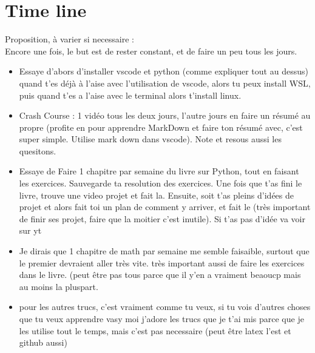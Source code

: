\documentclass[12pt]{article}
\begin{document}
\section{Time line}
Proposition, à varier si necessaire : \\
Encore une fois, le but est de rester constant, et de faire un peu tous les jours.\\
\begin{itemize}
  \item Essaye d'abors d'installer vscode et python (comme expliquer tout au dessus) quand t'es déjà à l'aise avec
  l'utilisation de vscode, alors tu peux install WSL, puis quand t'es a l'aise avec le terminal alors t'install linux.
  \item Crash Course : 1 vidéo tous les deux jours, l'autre jours en faire un résumé au propre (profite en pour 
  apprendre MarkDown et faire ton résumé avec, c'est super simple. Utilise mark down dans vscode). Note et resous aussi 
  les quesitons.
  \item Essaye de Faire 1 chapitre par semaine du livre sur Python, tout en faisant les exercices. Sauvegarde ta resolution 
  des exercices. Une fois que t'as fini le livre, trouve une video projet et fait la. Ensuite, soit t'as pleins d'idées de projet
  et alors fait toi un plan de comment y arriver, et fait le (très important de finir ses projet, faire que la moitier c'est inutile).
  Si t'as pas d'idée va voir sur yt
  \item Je dirais que 1 chapitre de math par semaine me semble faisaible, surtout que le premier devraient aller très vite.
  très important aussi de faire les exercices dans le livre. (peut être pas tous parce que il y'en a vraiment beaoucp mais au moins 
  la pluspart.
  \item pour les autres trucs, c'est vraiment comme tu veux, si tu vois d'autres choses que tu veux apprendre vasy
  moi j'adore les trucs que je t'ai mis parce que je les utilise tout le temps, mais c'est pas necessaire (peut être latex l'est et github aussi)
\end{itemize}
\end{document}

